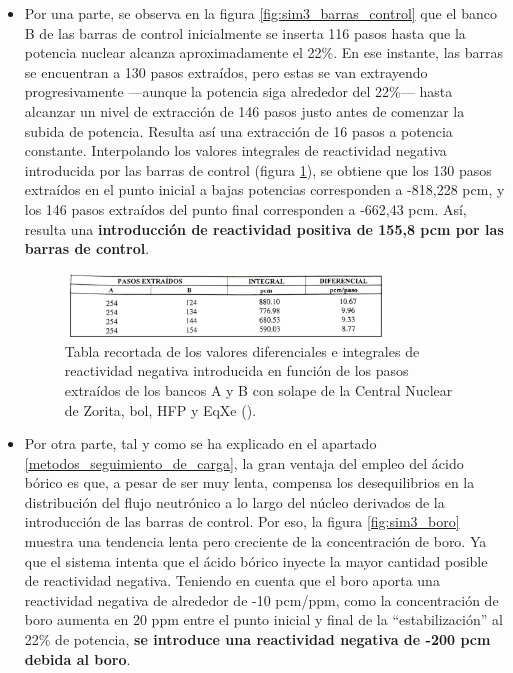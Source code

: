 \begin{itemize}
  \item Por una parte, se observa en la figura \ref{fig:sim3_barras_control} que el banco B de las barras de control inicialmente se inserta 116 pasos hasta que la potencia nuclear alcanza aproximadamente el 22\%. En ese instante, las barras se encuentran a 130 pasos extraídos, pero estas se van extrayendo progresivamente ---aunque la potencia siga alrededor del 22\%--- hasta alcanzar un nivel de extracción de 146 pasos justo antes de comenzar la subida de potencia. Resulta así una extracción de 16 pasos a potencia constante. Interpolando los valores integrales de reactividad negativa introducida por las barras de control (figura \ref{fig:tabla_reactividad_barras_control}), se obtiene que los 130 pasos extraídos en el punto inicial a bajas potencias corresponden a -818,228 pcm, y los 146 pasos extraídos del punto final corresponden a -662,43 pcm. Así, resulta una \textbf{introducción de reactividad positiva de 155,8 pcm por las barras de control}.
  
  \begin{figure}[!h]
    \centering
    \includegraphics[width=0.8\textwidth]{content/figures/tabla_reactividad_barras_control.pdf}
    \caption{Tabla recortada de los valores diferenciales e integrales de reactividad negativa introducida en función de los pasos extraídos de los bancos A y B con solape de la Central Nuclear de Zorita, \acrshort{bol}, HFP y EqXe (\cite{enusa_1998}).}
    \label{fig:tabla_reactividad_barras_control}
  \end{figure}

  \item Por otra parte, tal y como se ha explicado en el apartado \ref{metodos_seguimiento_de_carga}, la gran ventaja del empleo del ácido bórico es que, a pesar de ser muy lenta, compensa los desequilibrios en la distribución del flujo neutrónico a lo largo del núcleo derivados de la introducción de las barras de control. Por eso, la figura \ref{fig:sim3_boro} muestra una tendencia lenta pero creciente de la concentración de boro. Ya que el sistema intenta que el ácido bórico inyecte la mayor cantidad posible de reactividad negativa. Teniendo en cuenta que el boro aporta una reactividad negativa de alrededor de -10 pcm/ppm, como la concentración de boro aumenta en 20 ppm entre el punto inicial y final de la ``estabilización'' al 22\% de potencia, \textbf{se introduce una reactividad negativa de -200 pcm debida al boro}.
  

\end{itemize}
